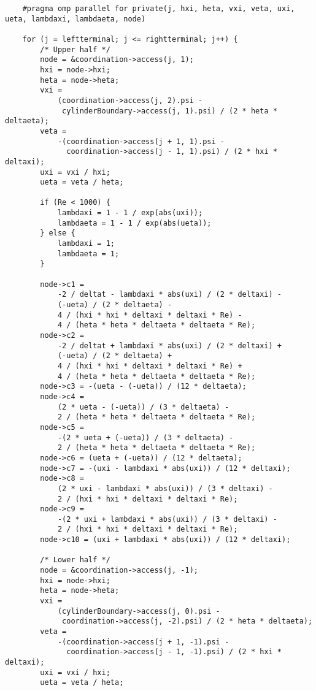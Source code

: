 \documentclass[12pt]{article}
\begin{document}
\begin{lstlisting}
    #pragma omp parallel for private(j, hxi, heta, vxi, veta, uxi, ueta, lambdaxi, lambdaeta, node)

    for (j = leftterminal; j <= rightterminal; j++) {
        /* Upper half */
        node = &coordination->access(j, 1);
        hxi = node->hxi;
        heta = node->heta;
        vxi =
            (coordination->access(j, 2).psi -
             cylinderBoundary->access(j, 1).psi) / (2 * heta * deltaeta);
        veta =
            -(coordination->access(j + 1, 1).psi -
              coordination->access(j - 1, 1).psi) / (2 * hxi * deltaxi);
        uxi = vxi / hxi;
        ueta = veta / heta;

        if (Re < 1000) {
            lambdaxi = 1 - 1 / exp(abs(uxi));
            lambdaeta = 1 - 1 / exp(abs(ueta));
        } else {
            lambdaxi = 1;
            lambdaeta = 1;
        }

        node->c1 =
            -2 / deltat - lambdaxi * abs(uxi) / (2 * deltaxi) -
            (-ueta) / (2 * deltaeta) -
            4 / (hxi * hxi * deltaxi * deltaxi * Re) -
            4 / (heta * heta * deltaeta * deltaeta * Re);
        node->c2 =
            -2 / deltat + lambdaxi * abs(uxi) / (2 * deltaxi) +
            (-ueta) / (2 * deltaeta) +
            4 / (hxi * hxi * deltaxi * deltaxi * Re) +
            4 / (heta * heta * deltaeta * deltaeta * Re);
        node->c3 = -(ueta - (-ueta)) / (12 * deltaeta);
        node->c4 =
            (2 * ueta - (-ueta)) / (3 * deltaeta) -
            2 / (heta * heta * deltaeta * deltaeta * Re);
        node->c5 =
            -(2 * ueta + (-ueta)) / (3 * deltaeta) -
            2 / (heta * heta * deltaeta * deltaeta * Re);
        node->c6 = (ueta + (-ueta)) / (12 * deltaeta);
        node->c7 = -(uxi - lambdaxi * abs(uxi)) / (12 * deltaxi);
        node->c8 =
            (2 * uxi - lambdaxi * abs(uxi)) / (3 * deltaxi) -
            2 / (hxi * hxi * deltaxi * deltaxi * Re);
        node->c9 =
            -(2 * uxi + lambdaxi * abs(uxi)) / (3 * deltaxi) -
            2 / (hxi * hxi * deltaxi * deltaxi * Re);
        node->c10 = (uxi + lambdaxi * abs(uxi)) / (12 * deltaxi);

        /* Lower half */
        node = &coordination->access(j, -1);
        hxi = node->hxi;
        heta = node->heta;
        vxi =
            (cylinderBoundary->access(j, 0).psi -
             coordination->access(j, -2).psi) / (2 * heta * deltaeta);
        veta =
            -(coordination->access(j + 1, -1).psi -
              coordination->access(j - 1, -1).psi) / (2 * hxi * deltaxi);
        uxi = vxi / hxi;
        ueta = veta / heta;


\end{lstlisting}
\end{document}
